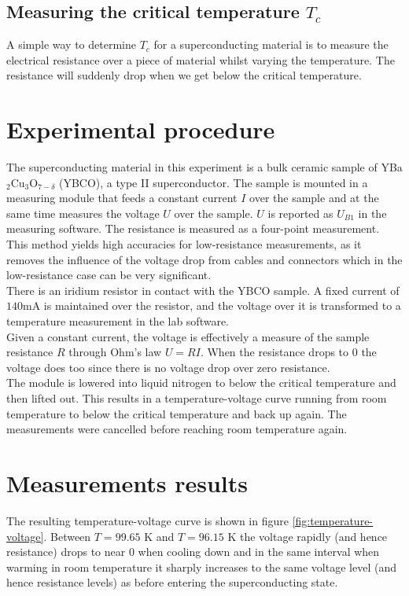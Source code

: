 \documentclass[a4paper,twoside=false,abstract=false,numbers=noenddot,
titlepage=false,headings=small,parskip=half,version=last]{scrartcl}
\begin{document}

\subsection{Measuring the critical temperature $T_c$}
A simple way to determine $T_c$ for a superconducting material is to measure
the electrical resistance over a piece of material whilst varying the
temperature.
The resistance will suddenly drop when we get below the critical temperature.

\section{Experimental procedure}
The superconducting material in this experiment is a bulk ceramic sample of
YBa$_2$Cu$_3$O$_{7-\delta}$ (YBCO), a type II superconductor.
The sample is mounted in a measuring module that feeds a constant current $I$
over the sample and at the same time measures the voltage $U$ over the sample.
$U$ is reported as $U_{B1}$ in the measuring software.
The resistance is measured as a four-point measurement. This method yields high accuracies for low-resistance measurements,
as it removes the influence of the voltage drop from cables and connectors
which in the low-resistance case can be very significant.\\
There is an iridium resistor in contact with the YBCO sample. A fixed current
of $140$mA is maintained over the resistor, and the voltage over it is transformed to a temperature measurement in the lab software.\\
Given a constant current, the voltage is effectively a measure of the sample
resistance $R$ through Ohm's law $U=RI$. When the resistance drops to 0 the
voltage does too since there is no voltage drop over zero resistance.\\
The module is lowered into liquid nitrogen to below the critical temperature and then lifted out.
This results in a temperature-voltage curve running from room temperature to below the critical temperature and back up again.
The measurements were cancelled before reaching room temperature again.

\section{Measurements results}
The resulting temperature-voltage curve is shown in figure
\ref{fig:temperature-voltage}. Between $T = 99.65$ K and $T = 96.15$ K the
voltage rapidly (and hence resistance) drops to near 0 when cooling down and in
the same interval when warming in room temperature it sharply increases to the
same voltage level (and hence resistance levels) as before entering the superconducting state.
\end{document}
